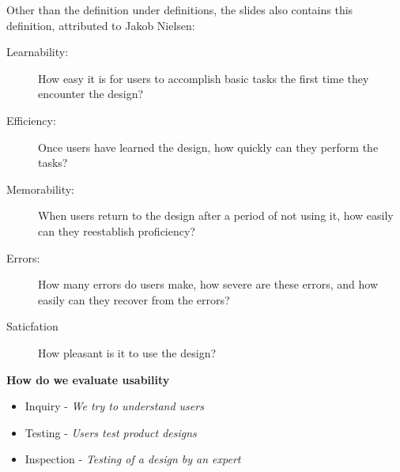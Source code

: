 Other than the definition under definitions, the slides also contains this definition, attributed to Jakob Nielsen:
\begin{description}
	\item[Learnability:] How easy it is for users to accomplish basic tasks the first time they encounter the design?
	\item[Efficiency:] Once users have learned the design, how quickly can they perform the tasks?
	\item[Memorability:] When users return to the design after a period of not using it, how easily can they reestablish proficiency?
	\item[Errors:] How many errors do users make, how severe are these errors, and how easily can they recover from the errors?
	\item[Saticfation] How pleasant is it to use the design?
\end{description}

\textbf{How do we evaluate usability}
\begin{itemize}
	\item Inquiry - \textit{We try to understand users}
	\item Testing - \textit{Users test product designs}
	\item Inspection - \textit{Testing of a design by an expert}
\end{itemize}

